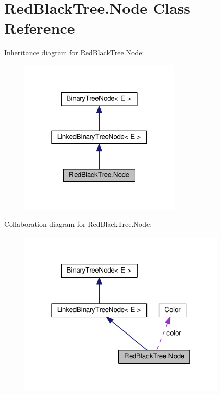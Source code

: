 \hypertarget{class_red_black_tree_1_1_node}{}\section{Red\+Black\+Tree.\+Node Class Reference}
\label{class_red_black_tree_1_1_node}


Inheritance diagram for Red\+Black\+Tree.\+Node\+:
\nopagebreak
\begin{figure}[H]
\begin{center}
\leavevmode
\includegraphics[width=220pt]{class_red_black_tree_1_1_node__inherit__graph}
\end{center}
\end{figure}


Collaboration diagram for Red\+Black\+Tree.\+Node\+:
\nopagebreak
\begin{figure}[H]
\begin{center}
\leavevmode
\includegraphics[width=283pt]{class_red_black_tree_1_1_node__coll__graph}
\end{center}
\end{figure}
